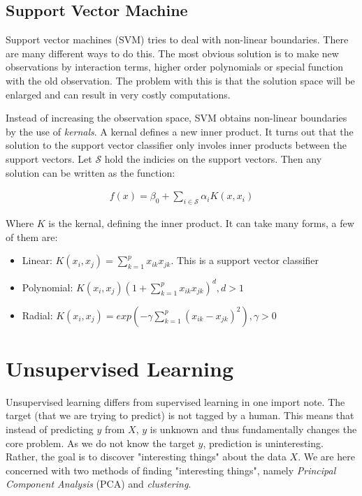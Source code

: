 \documentclass{article}
\begin{document}
\subsection{Support Vector Machine}
Support vector machines (SVM) tries to deal with non-linear boundaries. There are many different ways to do this. The most obvious solution is to make new observations by interaction terms, higher order polynomials or special function with the old observation. The problem with this is that the solution space will be enlarged and can result in very costly computations.  

Instead of increasing the observation space, SVM obtains non-linear boundaries by the use of \textit{kernals}. A kernal defines a new inner product. It turns out that the solution to the support vector classifier only involes inner products between the support vectors. Let $\mathcal{S}$ hold the indicies on the support vectors. Then any solution can be written as the function:

\begin{align*}
    f(x) = \beta_0 + \sum_{i \in \mathcal{S}} \alpha_i K(x, x_i)
\end{align*}

Where $K$ is the kernal, defining the inner product. It can take many forms, a few of them are:

\begin{itemize}
    \item Linear: $K(x_i, x_j) = \sum_{k=1}^{p} x_{ik}x_{jk}$. This is a support vector classifier
    \item Polynomial: $K(x_i, x_j) \left( 1+ \sum_{k=1}^{p} x_{ik}x_{jk}\right)^d, d > 1$
    \item Radial: $K(x_i, x_j) = exp(-\gamma \sum_{k=1}^{p}(x_{ik}-x_{jk})^2), \gamma > 0$
\end{itemize}

\section{Unsupervised Learning}
Unsupervised learning differs from supervised learning in one import note. The target (that we are trying to predict) is not tagged by a human. This means that instead of predicting $y$ from $X$, $y$ is unknown and thus fundamentally changes the core problem. As we do not know the target $y$, prediction is uninteresting. Rather, the goal is to discover "interesting things" about the data $X$. We are here concerned with two methods of finding "interesting things", namely \textit{Principal Component Analysis} (PCA) and \textit{clustering}.
\end{document}

